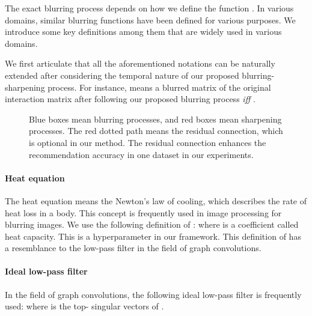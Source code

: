 \documentclass[sigconf,natbib=true]{acmart}
\begin{document}
The exact blurring process depends on how we define the function . In various domains, similar blurring functions have been defined for various purposes. We introduce some key definitions among them that are widely used in various domains.

We first articulate that all the aforementioned notations can be naturally extended after considering the temporal nature of our proposed blurring-sharpening process. For instance,  means a blurred matrix of the original interaction matrix after  following our proposed blurring process \textit{iff} .



\begin{figure}[t]
    \centering
    \caption{Blue boxes mean blurring processes, and red boxes mean sharpening processes. The red dotted path means the residual connection, which is optional in our method. The residual connection enhances the recommendation accuracy in one dataset in our experiments.}
    \label{fig:bspm}
\end{figure}

\paragraph{Heat equation} The heat equation means the Newton's law of cooling, which describes the rate of heat loss in a body. This concept is frequently used in image processing for blurring images. We use the following definition of :
where  is a coefficient called heat capacity. This is a hyperparameter in our framework. This definition of  has a resemblance to the low-pass filter in the field of graph convolutions.



\paragraph{Ideal low-pass filter} In the field of graph convolutions, the following ideal low-pass filter is frequently used:
where  is the top- singular vectors of .
\end{document}
